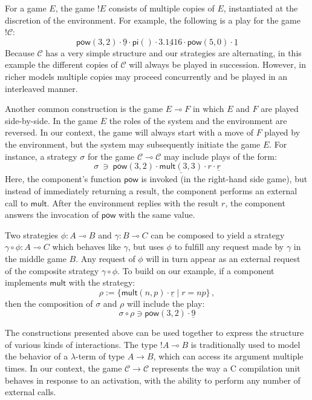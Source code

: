 \documentclass[sigplan,10pt,review,anonymous]{acmart}
\newcommand{\kw}[1]{\ensuremath{ \mathsf{#1} }}
\begin{document}
For a game $E$,
the game $!E$ consists of multiple copies of $E$,
instantiated at the discretion of the environment.
For example,
the following is a play for the game $!\mathcal{C}$:
\[
    \kw{pow}(3,2) \cdot
    \underline{9} \cdot
    \kw{pi}() \cdot
    \underline{3.1416} \cdot
    \kw{pow}(5,0) \cdot
    \underline{1}
\]
Because $\mathcal{C}$ has a very simple structure
and our strategies are alternating,
in this example the different copies of $\mathcal{C}$
will always be played in succession.
However,
in richer models multiple copies may proceed
concurrently
and be played in an interleaved manner.

Another common construction is the game $E \multimap F$
in which $E$ and $F$ are played side-by-side.
In the game $E$ the roles of the system and the environment
are reversed.
In our context,
the game will always start
with a move of $F$ played by the environment,
but the system may subsequently initiate the game $E$.
For instance, a strategy $\sigma$
for the game $\mathcal{C} \multimap \mathcal{C}$
may include plays of the form:
\[
    \sigma \: \ni \:
    \kw{pow}(3,2) \cdot
    \underline{\kw{mult}(3,3)} \cdot
    r \cdot
    \underline{r}
\]
Here,
the component's function $\kw{pow}$
is invoked (in the right-hand side game),
but instead of immediately returning a result,
the component performs an external call to $\kw{mult}$.
After the environment replies with the result $r$,
the component answers the invocation of $\kw{pow}$
with the same value.

Two strategies
$\phi : A \multimap B$ and
$\gamma : B \multimap C$ can be composed
to yield a strategy $\gamma \circ \phi : A \multimap C$
which behaves like $\gamma$,
but uses $\phi$ to fulfill any request made by $\gamma$
in the middle game $B$.
Any request of $\phi$ will in turn appear as
an external request of the composite strategy $\gamma \circ \phi$.
To build on our example,
if a component implements $\kw{mult}$
with the strategy:
\[ \rho := \{ \kw{mult}(n,p) \cdot \underline{r} \mid r = n p \} \,, \]
then the composition of $\sigma$ and $\rho$ will include the play:
\[ \sigma \circ \rho \ni \kw{pow}(3,2) \cdot \underline{9} \]

The constructions presented above can be used together
to express the structure of various kinds of interactions.
The type $!A \multimap B$ is traditionally used
to model the behavior of a $\lambda$-term of type $A \rightarrow B$,
which can access its argument multiple times.
In our context,
the game $\mathcal{C} \rightarrow \mathcal{C}$
represents the way a C compilation unit behaves in response to
an activation,
with the ability to perform any number of external calls.
\end{document}
